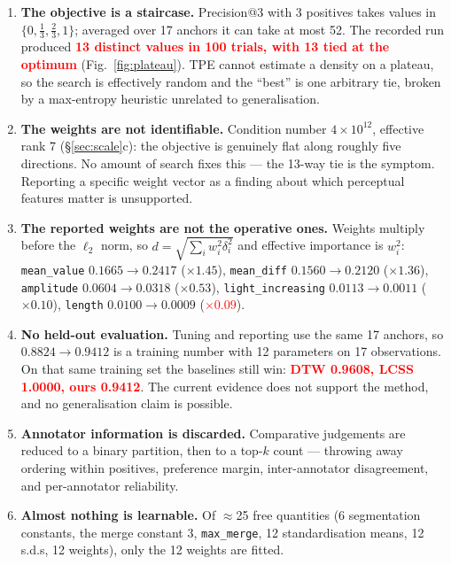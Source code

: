 \documentclass[11pt]{article}
\newcommand{\code}[1]{\texttt{\small #1}}
\newcommand{\finding}[1]{\textcolor{red}{\textbf{#1}}}
\begin{document}
\begin{enumerate}[leftmargin=*,label=\textbf{(\alph*)}]
  \item \textbf{The objective is a staircase.} Precision@3 with 3 positives takes values in
  $\{0,\tfrac13,\tfrac23,1\}$; averaged over 17 anchors it can take at most 52. The recorded
  run produced \finding{13 distinct values in 100 trials, with 13 tied at the optimum}
  (Fig.~\ref{fig:plateau}). TPE cannot estimate a density on a plateau, so the search is
  effectively random and the ``best'' is one arbitrary tie, broken by a max-entropy heuristic
  unrelated to generalisation.
  \item \textbf{The weights are not identifiable.} Condition number $4\times10^{12}$,
  effective rank 7 (\S\ref{sec:scale}c): the objective is genuinely flat along roughly five
  directions. No amount of search fixes this --- the 13-way tie is the symptom. Reporting a
  specific weight vector as a finding about which perceptual features matter is unsupported.
  \item \textbf{The reported weights are not the operative ones.} Weights multiply before the
  $\ell_2$ norm, so $d = \sqrt{\sum_i w_i^2\delta_i^2}$ and effective importance is $w_i^2$:
  \code{mean\_value} $0.1665\!\to\!0.2417$ ($\times1.45$), \code{mean\_diff}
  $0.1560\!\to\!0.2120$ ($\times1.36$), \code{amplitude} $0.0604\!\to\!0.0318$
  ($\times0.53$), \code{light\_increasing} $0.0113\!\to\!0.0011$ ($\times0.10$),
  \code{length} $0.0100\!\to\!0.0009$ (\finding{$\times0.09$}).
  \item \textbf{No held-out evaluation.} Tuning and reporting use the same 17 anchors, so
  $0.8824 \to 0.9412$ is a training number with 12 parameters on 17 observations. On that
  same training set the baselines still win: \finding{DTW 0.9608, LCSS 1.0000, ours 0.9412}.
  The current evidence does not support the method, and no generalisation claim is possible.
  \item \textbf{Annotator information is discarded.} Comparative judgements are reduced to a
  binary partition, then to a top-$k$ count --- throwing away ordering within positives,
  preference margin, inter-annotator disagreement, and per-annotator reliability.
  \item \textbf{Almost nothing is learnable.} Of $\approx$25 free quantities (6 segmentation
  constants, the merge constant 3, \code{max\_merge}, 12 standardisation means, 12 s.d.s, 12
  weights), only the 12 weights are fitted.
\end{enumerate}
\end{document}
